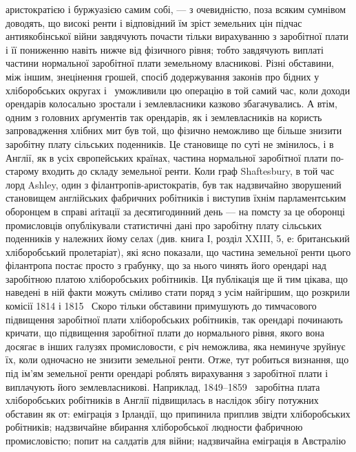 \parcont{}  %
аристократією і буржуазією самим собі, — з очевидністю, поза всяким сумнівом
доводять, що високі ренти і відповідний їм зріст земельних цін підчас антиякобінської
війни завдячують почасти тільки вирахуванню з заробітної плати
і її пониженню навіть нижче від фізичного рівня; тобто завдячують виплаті
частини нормальної заробітної плати земельному власникові. Різні обставини,
між іншим, знецінення грошей, спосіб додержування законів про бідних
у хліборобських округах і~ уможливили цю операцію в той самий час, коли
доходи орендарів колосально зростали і землевласники казково збагачувались.
А втім, одним з головних арґументів так орендарів, як і землевласників на
користь запровадження хлібних мит був той, що фізично неможливо ще більше
знизити заробітну плату сільських поденників. Це становище по суті не змінилось,
і в Англії, як в усіх європейських країнах, частина нормальної
заробітної плати по-старому входить до складу земельної ренти. Коли
граф Shaftesbury, в той час лорд Ashley, один з філантропів-аристократів,
був так надзвичайно зворушений становищем англійських фабричних робітників
і виступив їхнім парламентським оборонцем в справі аґітації за десятигодинний
день — на помсту за це оборонці промисловців опублікували статистичні
дані про заробітну плату сільських поденників у належних йому селах (див.
книга І, розділ XXIII, 5, е: британський хліборобський пролетаріат), які
ясно показали, що частина земельної ренти цього філантропа постає просто
з грабунку, що за нього чинять його орендарі над заробітною платою
хліборобських робітників. Ця публікація ще й тим цікава, що наведені в ній
факти можуть сміливо стати поряд з усім найгіршим, що розкрили комісії
1814 і 1815~ Скоро тільки обставини примушують до тимчасового підвищення
заробітної плати хліборобських робітників, так орендарі починають кричати, що
підвищення заробітної плати до нормального рівня, якого вона досягає в інших
галузях промисловости, є річ неможлива, яка неминуче зруйнує їх, коли
одночасно не знизити земельної ренти. Отже, тут робиться визнання, що під
ім’ям земельної ренти орендарі роблять вирахування з заробітної плати і виплачують
його землевласникові. Наприклад, 1849--1859~ заробітна плата хліборобських
робітників в Англії підвищилась в наслідок збігу потужних обставин
як от: еміграція з Ірландії, що припинила приплив звідти хліборобських
робітників; надзвичайне вбирання хліборобської людности фабричною промисловістю;
попит на салдатів для війни; надзвичайна еміграція в Австралію
